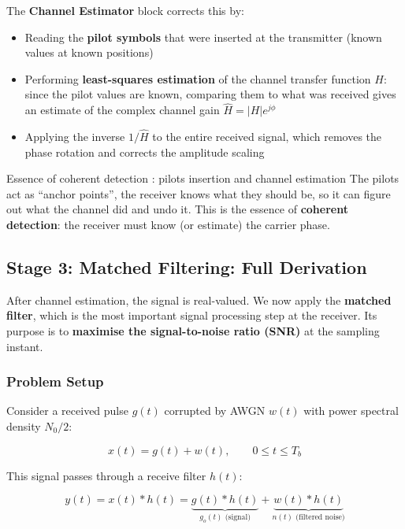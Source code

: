 The \textbf{Channel Estimator} block corrects this by:

\begin{itemize}
\item Reading the \textbf{pilot symbols} that were inserted at the transmitter (known values at known positions)
\item Performing \textbf{least-squares estimation} of the channel transfer function $H$: since the pilot values are known, comparing them to what was received gives an estimate of the complex channel gain $\hat{H} = |H|e^{j\phi}$
\item Applying the inverse $1/\hat{H}$ to the entire received signal, which removes the phase rotation and corrects the amplitude scaling
\end{itemize}

\begin{IntuitionBox}{Essence of coherent detection : pilots insertion and channel estimation}
 The pilots act as ``anchor points'', the receiver knows what they should be, so it can figure out what the channel did and undo it. This is the essence of \textbf{coherent detection}: the receiver must know (or estimate) the carrier phase.
\end{IntuitionBox}

\subsection{Stage 3: Matched Filtering: Full Derivation}

After channel estimation, the signal is real-valued. We now apply the \textbf{matched filter}, which is the most important signal processing step at the receiver. Its purpose is to \textbf{maximise the signal-to-noise ratio (SNR)} at the sampling instant.

\subsubsection{Problem Setup}

Consider a received pulse $g(t)$ corrupted by AWGN $w(t)$ with power spectral density $N_0/2$:

\begin{equation}
x(t) = g(t) + w(t), \qquad 0 \leq t \leq T_b
\end{equation}

This signal passes through a receive filter $h(t)$:

\begin{equation}
y(t) = x(t) * h(t) = \underbrace{g(t) * h(t)}_{g_o(t)\text{ (signal)}} + \underbrace{w(t) * h(t)}_{n(t)\text{ (filtered noise)}}
\end{equation}

